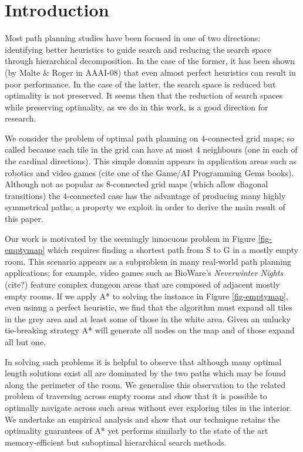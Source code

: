 \section{Introduction}
Most path planning studies have been focused in one of two directions: identifying better heuristics to guide search and reducing the search space through hierarchical decomposition.
In the case of the former, it has been shown (by Malte \& Roger in AAAI-08) that even almost perfect heuristics can result in poor performance. 
In the case of the latter, the search space is reduced but optimality is not preserved. 
It seems then that the reduction of search spaces while preserving optimality, as we do in this work, is a good direction for research.
\par
We consider the problem of optimal path planning on 4-connected grid maps; 
so called because each tile in the grid can have at most 4 neighbours (one in each of the cardinal directions).
This simple domain appears in application areas such as robotics \cite{latombe91} and video games 
(cite one of the Game/AI Programming Gems books).
Although not as popular as 8-connected grid maps (which allow diagonal transitions) the 4-connected case has 
the advantage of producing many highly symmetrical paths; 
a property we exploit in order to derive the main result of this paper.
\par 
Our work is motivated by the seemingly innocuous problem in Figure \ref{fig-emptymap} 
which requires finding a shortest path from S to G in a mostly empty room.
This scenario appears as a subproblem in many real-world path planning applications;
for example, video games such as  BioWare's \emph{Neverwinter Nights} (cite?) feature complex dungeon
 areas that are composed of adjacent mostly empty rooms.
If we apply A* \cite{hart68} to solving the instance in Figure \ref{fig-emptymap}, even usinng a perfect heuristic, we find that the algorithm must expand all tiles in the grey area and at least some of those in the 
white area.
Given an unlucky tie-breaking strategy A* will generate all nodes on the map and of those expand all but one.
\par
In solving such problems it is helpful to observe that although many optimal length solutions exist
all are dominated by the two paths which may be found along the perimeter of the room. 
We generalise this observation to the related problem of traversing across empty rooms and show that
it is possible to optimally navigate across such areas without ever exploring tiles in the interior.
We undertake an empirical analysis and show that our technique retains the optimality guarantees of A* 
yet performs similarly to the state of the art memory-efficient but suboptimal hierarchical search methods.

